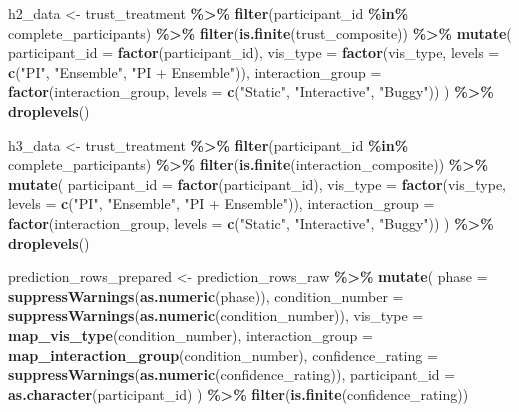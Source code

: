 \documentclass[
]{article}
\newenvironment{Shaded}{\begin{snugshade}}{\end{snugshade}}
\newcommand{\AttributeTok}[1]{\textcolor[rgb]{0.13,0.29,0.53}{#1}}
\newcommand{\FunctionTok}[1]{\textcolor[rgb]{0.13,0.29,0.53}{\textbf{#1}}}
\newcommand{\NormalTok}[1]{#1}
\newcommand{\OtherTok}[1]{\textcolor[rgb]{0.56,0.35,0.01}{#1}}
\newcommand{\SpecialCharTok}[1]{\textcolor[rgb]{0.81,0.36,0.00}{\textbf{#1}}}
\newcommand{\StringTok}[1]{\textcolor[rgb]{0.31,0.60,0.02}{#1}}
\begin{document}
\begin{Shaded}
\begin{Highlighting}[]
\NormalTok{h2\_data }\OtherTok{\textless{}{-}}\NormalTok{ trust\_treatment }\SpecialCharTok{\%\textgreater{}\%}
  \FunctionTok{filter}\NormalTok{(participant\_id }\SpecialCharTok{\%in\%}\NormalTok{ complete\_participants) }\SpecialCharTok{\%\textgreater{}\%}
  \FunctionTok{filter}\NormalTok{(}\FunctionTok{is.finite}\NormalTok{(trust\_composite)) }\SpecialCharTok{\%\textgreater{}\%}
  \FunctionTok{mutate}\NormalTok{(}
    \AttributeTok{participant\_id =} \FunctionTok{factor}\NormalTok{(participant\_id),}
    \AttributeTok{vis\_type =} \FunctionTok{factor}\NormalTok{(vis\_type, }\AttributeTok{levels =} \FunctionTok{c}\NormalTok{(}\StringTok{"PI"}\NormalTok{, }\StringTok{"Ensemble"}\NormalTok{, }\StringTok{"PI + Ensemble"}\NormalTok{)),}
    \AttributeTok{interaction\_group =} \FunctionTok{factor}\NormalTok{(interaction\_group, }\AttributeTok{levels =} \FunctionTok{c}\NormalTok{(}\StringTok{"Static"}\NormalTok{, }\StringTok{"Interactive"}\NormalTok{, }\StringTok{"Buggy"}\NormalTok{))}
\NormalTok{  ) }\SpecialCharTok{\%\textgreater{}\%}
  \FunctionTok{droplevels}\NormalTok{()}

\NormalTok{h3\_data }\OtherTok{\textless{}{-}}\NormalTok{ trust\_treatment }\SpecialCharTok{\%\textgreater{}\%}
  \FunctionTok{filter}\NormalTok{(participant\_id }\SpecialCharTok{\%in\%}\NormalTok{ complete\_participants) }\SpecialCharTok{\%\textgreater{}\%}
  \FunctionTok{filter}\NormalTok{(}\FunctionTok{is.finite}\NormalTok{(interaction\_composite)) }\SpecialCharTok{\%\textgreater{}\%}
  \FunctionTok{mutate}\NormalTok{(}
    \AttributeTok{participant\_id =} \FunctionTok{factor}\NormalTok{(participant\_id),}
    \AttributeTok{vis\_type =} \FunctionTok{factor}\NormalTok{(vis\_type, }\AttributeTok{levels =} \FunctionTok{c}\NormalTok{(}\StringTok{"PI"}\NormalTok{, }\StringTok{"Ensemble"}\NormalTok{, }\StringTok{"PI + Ensemble"}\NormalTok{)),}
    \AttributeTok{interaction\_group =} \FunctionTok{factor}\NormalTok{(interaction\_group, }\AttributeTok{levels =} \FunctionTok{c}\NormalTok{(}\StringTok{"Static"}\NormalTok{, }\StringTok{"Interactive"}\NormalTok{, }\StringTok{"Buggy"}\NormalTok{))}
\NormalTok{  ) }\SpecialCharTok{\%\textgreater{}\%}
  \FunctionTok{droplevels}\NormalTok{()}

\NormalTok{prediction\_rows\_prepared }\OtherTok{\textless{}{-}}\NormalTok{ prediction\_rows\_raw }\SpecialCharTok{\%\textgreater{}\%}
  \FunctionTok{mutate}\NormalTok{(}
    \AttributeTok{phase =} \FunctionTok{suppressWarnings}\NormalTok{(}\FunctionTok{as.numeric}\NormalTok{(phase)),}
    \AttributeTok{condition\_number =} \FunctionTok{suppressWarnings}\NormalTok{(}\FunctionTok{as.numeric}\NormalTok{(condition\_number)),}
    \AttributeTok{vis\_type =} \FunctionTok{map\_vis\_type}\NormalTok{(condition\_number),}
    \AttributeTok{interaction\_group =} \FunctionTok{map\_interaction\_group}\NormalTok{(condition\_number),}
    \AttributeTok{confidence\_rating =} \FunctionTok{suppressWarnings}\NormalTok{(}\FunctionTok{as.numeric}\NormalTok{(confidence\_rating)),}
    \AttributeTok{participant\_id =} \FunctionTok{as.character}\NormalTok{(participant\_id)}
\NormalTok{  ) }\SpecialCharTok{\%\textgreater{}\%}
  \FunctionTok{filter}\NormalTok{(}\FunctionTok{is.finite}\NormalTok{(confidence\_rating))}


\end{Highlighting}
\end{Shaded}
\end{document}

